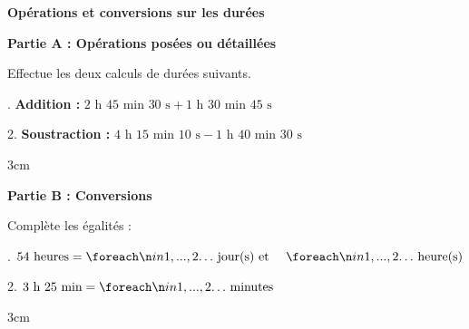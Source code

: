 \documentclass[a4paper]{book}
\begin{document}
{    %
    \begin{exercice}
        \textbf{Opérations et conversions sur les durées}
        
        \textbf{Partie A : Opérations posées ou détaillées}
        
        Effectue les deux calculs de durées suivants.
        
        . \textbf{Addition :} $2\text{ h } 45\text{ min } 30\text{ s} + 1\text{ h } 30\text{ min } 45\text{ s}$
        
        2. \textbf{Soustraction :} $4\text{ h } 15\text{ min } 10\text{ s} - 1\text{ h } 40\text{ min } 30\text{ s}$
        
        \begin{ZoneReponse}{3cm}
        \end{ZoneReponse}
    
        \textbf{Partie B : Conversions}
        
        Complète les égalités :
        
        . $54\text{ heures} = \points[2]\text{ jour(s) et }\quad \points[2]\text{ heure(s)}$
    
        2. $3\text{ h } 25\text{ min} = \points[2]\text{ minutes}$
        
        \begin{ZoneReponse}{3cm}
        \end{ZoneReponse}
    \end{exercice}

}
\end{document}
